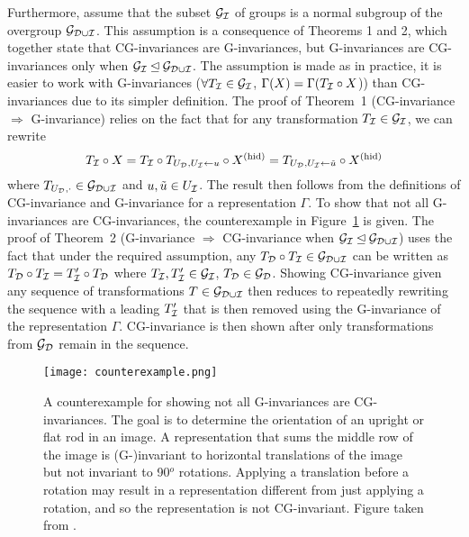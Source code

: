 Furthermore, \citeauthor{Mouli:2021} assume that the subset $\mathcal{G}_{\mathcal{I}}$ of groups is a normal subgroup of the overgroup $\mathcal{G}_{\mathcal{D}\cup\mathcal{I}}$. This assumption is a consequence of Theorems 1 and 2, which together state that CG-invariances are G-invariances, but G-invariances are CG-invariances only when $\mathcal{G}_{\mathcal{I}}\unlhd\mathcal{G}_{\mathcal{D}\cup\mathcal{I}}$. The assumption is made as in practice, it is easier to work with G-invariances ($\forall T_{\mathcal{I}}\in\mathcal{G}_{\mathcal{I}}$, $\Gamma(X)=\Gamma(T_{\mathcal{I}}\circ X$)) than CG-invariances due to its simpler definition. The proof of Theorem~1 (CG-invariance $\Rightarrow$ G-invariance) relies on the fact that for any transformation $T_{\mathcal{I}}\in\mathcal{G}_{\mathcal{I}}$, we can rewrite
\[
T_{\mathcal{I}}\circ X = T_{\mathcal{I}}\circ T_{U_{\mathcal{D}},U_{\mathcal{I}}\leftarrow u}\circ X^\text{(hid)} = T_{U_{\mathcal{D}},U_{\mathcal{I}}\leftarrow\tilde{u}}\circ X^\text{(hid)}
\]
where $T_{U_{\mathcal{D}},\cdot}\in\mathcal{G}_{\mathcal{D}\cup\mathcal{I}}$ and $u,\tilde{u}\in U_{\mathcal{I}}$. The result then follows from the definitions of CG-invariance and G-invariance for a representation $\Gamma$. To show that not all G-invariances are CG-invariances, the counterexample in Figure~\ref{fig:counterexample} is given. The proof of Theorem~2 (G-invariance $\Rightarrow$ CG-invariance when $\mathcal{G}_{\mathcal{I}}\unlhd\mathcal{G}_{\mathcal{D}\cup\mathcal{I}}$) uses the fact that under the required assumption, any $T_{\mathcal{D}}\circ T_{\mathcal{I}} \in\mathcal{G}_{\mathcal{D}\cup\mathcal{I}}$ can be written as $T_{\mathcal{D}}\circ T_{\mathcal{I}}=T_{\mathcal{I}}'\circ T_{\mathcal{D}}$ where $T_{\mathcal{I}},T_{\mathcal{I}}'\in\mathcal{G}_{\mathcal{I}}$, $T_{\mathcal{D}}\in\mathcal{G}_{\mathcal{D}}$. Showing CG-invariance given any sequence of transformations $T\in\mathcal{G}_{\mathcal{D}\cup\mathcal{I}}$ then reduces to repeatedly rewriting the sequence with a leading $T_{\mathcal{I}}'$ that is then removed using the G-invariance of the representation $\Gamma$. CG-invariance is then shown after only transformations from $\mathcal{G}_{\mathcal{D}}$ remain in the sequence. 

\begin{figure}[H]
\centering
\texttt{[image: counterexample.png]}
\caption{A counterexample for showing not all G-invariances are CG-invariances. The goal is to determine the orientation of an upright or flat rod in an image. A representation that sums the middle row of the image is (G-)invariant to horizontal translations of the image but not invariant to 90$^o$ rotations. Applying a translation before a rotation may result in a representation different from just applying a rotation, and so the representation is not CG-invariant. Figure taken from \parencite{Mouli:2021}.}
\label{fig:counterexample}
\end{figure}

